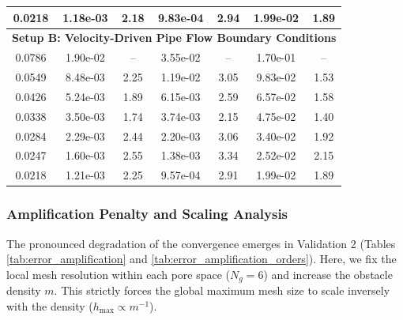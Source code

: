 \documentclass{elsarticle}
\begin{document}
\begin{table}[htbp]
{\begin{tabular}{ccccccc}
            0.0218     & 1.18e-03         & 2.18        & 9.83e-04                  & 2.94                       & 1.99e-02                  & 1.89                       \\
            \midrule
            \multicolumn{7}{c}{\textbf{Setup B: Velocity-Driven Pipe Flow Boundary Conditions}}                                                                           \\
            \midrule
            0.0786     & 1.90e-02         & --          & 3.55e-02                  & --                         & 1.70e-01                  & --                         \\
            0.0549     & 8.48e-03         & 2.25        & 1.19e-02                  & 3.05                       & 9.83e-02                  & 1.53                       \\
            0.0426     & 5.24e-03         & 1.89        & 6.15e-03                  & 2.59                       & 6.57e-02                  & 1.58                       \\
            0.0338     & 3.50e-03         & 1.74        & 3.74e-03                  & 2.15                       & 4.75e-02                  & 1.40                       \\
            0.0284     & 2.29e-03         & 2.44        & 2.20e-03                  & 3.06                       & 3.40e-02                  & 1.92                       \\
            0.0247     & 1.60e-03         & 2.55        & 1.38e-03                  & 3.34                       & 2.52e-02                  & 2.15                       \\
            0.0218     & 1.21e-03         & 2.25        & 9.57e-04                  & 2.91                       & 1.99e-02                  & 1.89                       \\
            \bottomrule
        \end{tabular}
    }
\end{table}

\subsubsection{Amplification Penalty and Scaling Analysis}

The pronounced degradation of the convergence emerges in Validation 2 (Tables \ref{tab:error_amplification} and \ref{tab:error_amplification_orders}). Here, we fix the local mesh resolution within each pore space ($N_g=6$) and increase the obstacle density $m$. This strictly forces the global maximum mesh size to scale inversely with the density ($h_{\max} \propto m^{-1}$).
\end{document}
